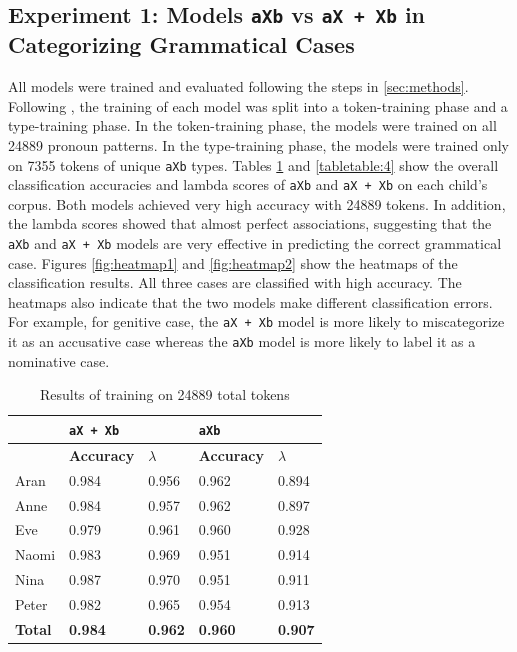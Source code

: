 \subsection{Experiment 1: Models \texttt{aXb} vs \texttt{aX + Xb} in Categorizing Grammatical Cases}
All models were trained and evaluated following the steps in \ref{sec:methods}. Following \cite{clair2010learning}, the training of each model was split into a token-training phase and a type-training phase. In the token-training phase, the models were trained on all 24889 pronoun patterns. In the type-training phase, the models were trained only on 7355 tokens of unique \texttt{aXb} types. Tables \ref{tabletable:3} and \ref{tabletable:4} show the overall classification accuracies and lambda scores of \texttt{aXb} and \texttt{aX + Xb} on each child's corpus. Both models achieved very high accuracy with 24889 tokens. In addition, the lambda scores showed that almost perfect associations, suggesting that the \texttt{aXb} and \texttt{aX + Xb} models are very effective in predicting the correct grammatical case. Figures \ref{fig:heatmap1} and \ref{fig:heatmap2} show the heatmaps of the classification results. All three cases are classified with high accuracy. The heatmaps also indicate that the two models make different classification errors. For example, for genitive case, the \texttt{aX + Xb} model is more likely to miscategorize it as an accusative case whereas the \texttt{aXb} model is more likely to label it as a nominative case.  
\FloatBarrier
\begin{table}[!h]
\centering
\caption{Results of training on 24889 total tokens}
\label{tabletable:3}
\begin{tabular}{lllll}
\hline
 & \multicolumn{2}{l}{\textbf{\texttt{aX + Xb}}} & \multicolumn{2}{l}{\textbf{
\texttt{aXb}}} \\ \hline
 & \textbf{Accuracy} & \textbf{$\lambda$} & \textbf{Accuracy} & \textbf{$\lambda$} \\ \hline
Aran & 0.984 & 0.956 & 0.962 & 0.894 \\
Anne & 0.984 & 0.957 & 0.962 & 0.897 \\
Eve & 0.979 & 0.961 & 0.960 & 0.928 \\
Naomi & 0.983 & 0.969 & 0.951 & 0.914 \\
Nina & 0.987 & 0.970 & 0.951 & 0.911 \\
Peter & 0.982 & 0.965 & 0.954 & 0.913 \\
\textbf{Total} & \textbf{0.984} & \textbf{0.962} & \textbf{0.960} & \textbf{0.907} \\ \hline
\end{tabular}
\end{table}
